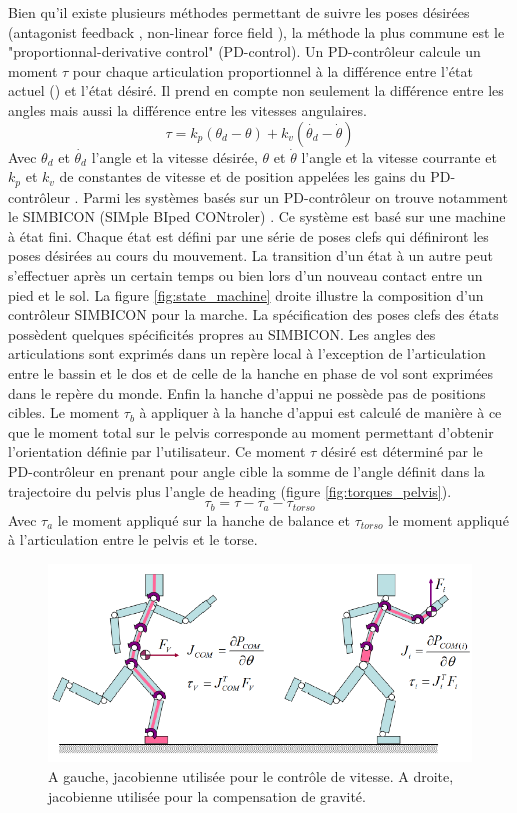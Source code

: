 \documentclass{llncs}
\begin{document}
Bien qu'il existe plusieurs méthodes permettant de suivre les poses désirées (antagonist feedback \cite{neff2002modeling}, non-linear force field \cite{mussa1997nonlinear}), la méthode la plus commune est le "proportionnal-derivative control" (PD-control). Un PD-contrôleur calcule un moment  \(\tau\) pour chaque articulation proportionnel à la différence entre l'état actuel () et l'état désiré. Il prend en compte non seulement la différence entre les angles mais aussi la différence entre les vitesses angulaires. 
\[
\tau=k_p(\theta_d - \theta) + k_v(\dot{\theta_d} - \dot{\theta})
\]
Avec \(\theta_d\) et \(\dot{\theta_d}\) l'angle et la vitesse désirée, \(\theta\) et \(\dot{\theta}\) l'angle et la vitesse courrante et \(k_p\) et \(k_v\) de constantes de vitesse et de position appelées les gains du PD-contrôleur .
Parmi les systèmes basés sur un PD-contrôleur on trouve notamment le SIMBICON (SIMple BIped CONtroler) \cite{yin2007simbicon}. Ce système est basé sur une machine à état fini. Chaque état est défini par une série de poses clefs qui définiront les poses désirées au cours du mouvement. La transition d'un état à un autre peut s'effectuer après un certain temps ou bien lors d'un nouveau contact entre un pied et le sol. La figure \ref{fig:state_machine} droite illustre la composition d'un contrôleur SIMBICON pour la marche. La spécification des poses clefs des états possèdent quelques spécificités propres au SIMBICON. Les angles des articulations sont exprimés dans un repère local à l'exception de l'articulation entre le bassin et le dos et de celle de la hanche en phase de vol sont exprimées dans le repère du monde. Enfin la hanche d'appui ne possède pas de positions cibles. Le moment \(\tau_b \) à appliquer à la hanche d'appui est calculé de manière à ce que le moment total sur le pelvis corresponde au moment permettant d'obtenir l'orientation définie par l'utilisateur. Ce moment \(\tau \) désiré est déterminé par le PD-contrôleur en prenant pour angle cible la somme de l'angle définit dans la trajectoire du pelvis plus l'angle de heading (figure \ref{fig:torques_pelvis}).
\[
\tau_b=\tau - \tau_a - \tau_{torso}
\]
Avec \(\tau_a \) le moment appliqué sur la hanche de balance et \(\tau_{torso} \) le moment appliqué à l'articulation entre le pelvis et le torse.


\label{sec:jacob}
\begin{figure}[h]
\centering
\includegraphics[scale=0.5]{shema_jacobians.png}
\caption{A gauche, jacobienne utilisée pour le contrôle de vitesse. A droite, jacobienne utilisée pour la compensation de gravité. \cite{coros2010generalized} }
\label{fig:jacob}
\end{figure}
\end{document}
